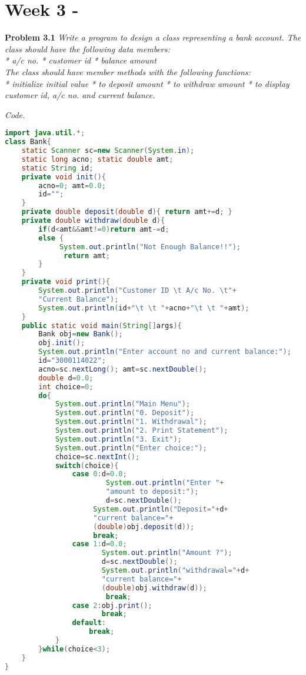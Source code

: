\documentclass[12pt]{article}
\begin{document}
\setlength{\fboxrule}{.5mm}\setlength{\fboxsep}{1.2mm}
\addtolength{\boxlength}{-4mm}
\begin{center}\end{center}
\vspace{5mm}

\section{Week 3 - }

\textbf{Problem 3.1} \textit{Write a program to design a class representing a bank account. The class should have the following data members:\\
* a/c no. * customer id * balance amount\\
The class should have member methods with the following functions:\\
* initialize initial value
* to deposit amount
* to withdraw amount
* to display customer id, a/c no. and current balance.}


\textit{Code.}

\begin{lstlisting}[language=Java]
import java.util.*;
class Bank{
	static Scanner sc=new Scanner(System.in);
	static long acno; static double amt;
	static String id;
	private void init(){
		acno=0; amt=0.0;
		id="";
	}
	private double deposit(double d){ return amt+=d; }
	private double withdraw(double d){
		if(d<amt&&amt!=0)return amt-=d;
		else {
			 System.out.println("Not Enough Balance!!");
			  return amt;
		}
	}
	private void print(){
		System.out.println("Customer ID \t A/c No. \t"+
		"Current Balance");
		System.out.println(id+"\t \t "+acno+"\t \t "+amt);
	}
	public static void main(String[]args){
		Bank obj=new Bank();
		obj.init();
		System.out.println("Enter account no and current balance:");
		id="3000114022";
		acno=sc.nextLong(); amt=sc.nextDouble();
		double d=0.0;
		int choice=0;
		do{
			System.out.println("Main Menu");
			System.out.println("0. Deposit");
			System.out.println("1. Withdrawal");
			System.out.println("2. Print Statement");
			System.out.println("3. Exit");
			System.out.println("Enter choice:");
			choice=sc.nextInt();
			switch(choice){
				case 0:d=0.0;
				        System.out.println("Enter "+
				        "amount to deposit:");
				        d=sc.nextDouble();
					 System.out.println("Deposit="+d+
					 "current balance="+
					 (double)obj.deposit(d));
					 break;
				case 1:d=0.0;
				       System.out.println("Amount ?");
				       d=sc.nextDouble();
				       System.out.println("withdrawal="+d+
				       "current balance="+
				       (double)obj.withdraw(d));
				        break;
				case 2:obj.print();
				       break;
				default:
					break;
			}
		}while(choice<3);
	}
}

\end{lstlisting}
\end{document}
